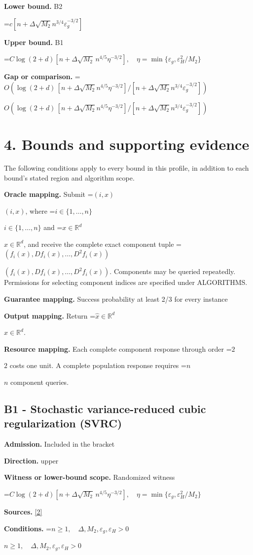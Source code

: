 \documentclass[10pt,a4paper]{article}
\newcommand{\AtlasMath}[1]{\par\begingroup\centering\setbox0=\hbox{$\displaystyle #1$}\ifdim\wd0>1.4\linewidth\typeout{ATLAS WIDE FORMULA: \the\wd0}\fi\ifdim\wd0>\linewidth\resizebox{\linewidth}{!}{\box0}\else\box0\fi\par\endgroup}
\newcommand{\AtlasInlineMath}[1]{\begingroup\setbox0=\hbox{$#1$}\ifdim\wd0>.4\linewidth\endgroup\AtlasMath{#1}\else\endgroup$#1$\fi}
\begin{document}
\textbf{Lower bound.} B2

\AtlasMath{c[n+\Delta\sqrt{M_2}n^{3/4}\varepsilon_g^{-3/2}]}
\textbf{Upper bound.} B1

\AtlasMath{C\log(2+d)[n+\Delta\sqrt{M_2}\,n^{4/5}\eta^{-3/2}],\quad\eta=\min\{\varepsilon_g,\varepsilon_H^2/M_2\}}
\textbf{Gap or comparison.} \AtlasInlineMath{O(\log(2+d)\,[n+\Delta\sqrt{M_2}n^{4/5}\eta^{-3/2}]/[n+\Delta\sqrt{M_2}n^{3/4}\varepsilon_g^{-3/2}])}

\section{4. Bounds and supporting evidence}
The following conditions apply to every bound in this profile, in addition to each bound's stated region and algorithm scope.

\textbf{Oracle mapping.} Submit \AtlasInlineMath{(i,x)}, where \AtlasInlineMath{i\in\{1,\ldots,n\}} and \AtlasInlineMath{x\in\mathbb{R}^d}, and receive the complete exact component tuple \AtlasInlineMath{(f_i(x),Df_i(x),\ldots,D^{2}f_i(x))}. Components may be queried repeatedly. Permissions for selecting component indices are specified under ALGORITHMS.

\textbf{Guarantee mapping.} Success probability at least 2/3 for every instance

\textbf{Output mapping.} Return \AtlasInlineMath{\widehat{x}\in \mathbb{R}^d}.

\textbf{Resource mapping.} Each complete component response through order \AtlasInlineMath{2} costs one unit. A complete population response requires \AtlasInlineMath{n} component queries.

\subsection{B1 - Stochastic variance-reduced cubic regularization (SVRC)}
\textbf{Admission.} Included in the bracket

\textbf{Direction.} upper

\textbf{Witness or lower-bound scope.} Randomized witness

\AtlasMath{C\log(2+d)[n+\Delta\sqrt{M_2}\,n^{4/5}\eta^{-3/2}],\quad\eta=\min\{\varepsilon_g,\varepsilon_H^2/M_2\}}
\textbf{Sources.} \href{https://jmlr.org/papers/volume20/19-055/19-055.pdf}{[2]}

\textbf{Conditions.} \AtlasInlineMath{n\ge1,\quad\Delta,M_2,\varepsilon_g,\varepsilon_H>0}
\end{document}
